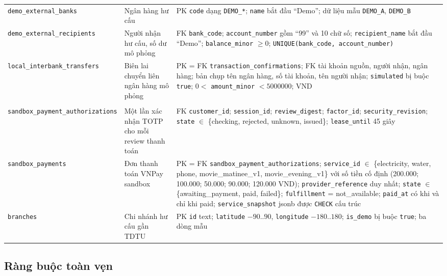 {\begin{longtable}{>{\raggedright\arraybackslash}p{}>{\raggedright\arraybackslash}p{}>{\raggedright\arraybackslash}p{}}
\texttt{demo\_external\_\allowbreak banks} & Ngân hàng hư cấu & PK \texttt{code} dạng \texttt{DEMO\_\allowbreak{}*}; \texttt{name} bắt đầu ``Demo''; dữ liệu mẫu \texttt{DEMO\_\allowbreak{}A}, \texttt{DEMO\_\allowbreak{}B} \\
\texttt{demo\_external\_\allowbreak recipients} & Người nhận hư cấu, số dư mô phỏng & FK \texttt{bank\_\allowbreak{}code}; \texttt{account\_\allowbreak{}number} gồm ``99'' và 10 chữ số; \texttt{recipient\_\allowbreak{}name} bắt đầu ``Demo''; \texttt{balance\_\allowbreak{}minor} $\geq 0$; \texttt{UNIQUE(bank\_\allowbreak{}code, account\_\allowbreak{}number)} \\
\texttt{local\_interbank\_\allowbreak transfers} & Biên lai chuyển liên ngân hàng mô phỏng & PK = FK \texttt{transaction\_\allowbreak{}confirmations}; FK tài khoản nguồn, người nhận, ngân hàng; bản chụp tên ngân hàng, số tài khoản, tên người nhận; \texttt{simulated} bị buộc \texttt{true}; $0 <$ \texttt{amount\_\allowbreak{}minor} $< 5000000$; VND \\
\multicolumn{3}{l}{\textit{Thanh toán sandbox và chi nhánh}} \\
\texttt{sandbox\_payment\_\allowbreak authorizations} & Một lần xác nhận TOTP cho mỗi review thanh toán & FK \texttt{customer\_\allowbreak{}id}; \texttt{session\_\allowbreak{}id}; \texttt{review\_\allowbreak{}digest}; \texttt{factor\_\allowbreak{}id}; \texttt{security\_\allowbreak{}revision}; \texttt{state} $\in$ \{checking, rejected, unknown, issued\}; \texttt{lease\_\allowbreak{}until} 45 giây \\
\texttt{sandbox\_\allowbreak{}payments} & Đơn thanh toán VNPay sandbox & PK = FK \texttt{sandbox\_\allowbreak{}payment\_\allowbreak{}authorizations}; \texttt{service\_\allowbreak{}id} $\in$ \{electricity, water, phone, movie\_matinee\_v1, movie\_evening\_v1\} với số tiền cố định (200.000; 100.000; 50.000; 90.000; 120.000 VND); \texttt{provider\_\allowbreak{}reference} duy nhất; \texttt{state} $\in$ \{awaiting\_payment, paid, failed\}; \texttt{fulfillment} = not\_available; \texttt{paid\_\allowbreak{}at} có khi và chỉ khi paid; \texttt{service\_\allowbreak{}snapshot} jsonb được \texttt{CHECK} cấu trúc \\
\texttt{branches} & Chi nhánh hư cấu gần TDTU & PK \texttt{id} text; \texttt{latitude} $-90$..$90$, \texttt{longitude} $-180$..$180$; \texttt{is\_\allowbreak{}demo} bị buộc \texttt{true}; ba dòng mẫu \\
\end{longtable}
}

\subsection{Ràng buộc toàn vẹn}
\label{sec:ch2-integrity}


